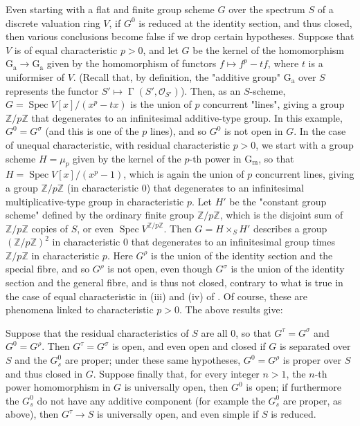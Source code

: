 \begin{remark}
    Even starting with a flat and finite group scheme $G$ over the spectrum $S$ of a discrete valuation ring $V$, if $G^0$ is reduced at the identity section, and thus closed, then various conclusions become false if we drop certain hypotheses.
    Suppose that $V$ is of equal characteristic $p>0$, and let $G$ be the kernel of the homomorphism $\operatorname{G_a}\to\operatorname{G_a}$ given by the homomorphism of functors $f\mapsto f^p-tf$, where $t$ is a uniformiser of $V$.
    (Recall that, by definition, the "additive group" $\operatorname{G_a}$ over $S$ represents the functor $S'\mapsto\operatorname{\Gamma}(S',\mathcal{O}_{S'})$).
    Then, as an $S$-scheme, $G=\operatorname{Spec} V[x]/(x^p-tx)$ is the union of $p$ concurrent "lines", giving a group $\mathbb{Z}/p\mathbb{Z}$ that degenerates to an infinitesimal additive-type group.
    In this example, $G^0=G^\sigma$ (and this is one of the $p$ lines), and so $G^0$ is not open in $G$.
    In the case of unequal characteristic, with residual characteristic $p>0$, we start with a group scheme $H=\mu_p$ given by the kernel of the $p$-th power in $\operatorname{G_m}$, so that $H=\operatorname{Spec} V[x]/(x^p-1)$, which is again the union of $p$ concurrent lines, giving a group $\mathbb{Z}/p\mathbb{Z}$ (in characteristic $0$) that degenerates to an infinitesimal multiplicative-type group in characteristic $p$.
    Let $H'$ be the "constant group scheme" defined by the ordinary finite group $\mathbb{Z}/p\mathbb{Z}$, which is the disjoint sum of $\mathbb{Z}/p\mathbb{Z}$ copies of $S$, or even $\operatorname{Spec} V^{\mathbb{Z}/p\mathbb{Z}}$.
    Then $G=H\times_S H'$ describes a group $(\mathbb{Z}/p\mathbb{Z})^2$ in characteristic $0$ that degenerates to an infinitesimal group times $\mathbb{Z}/p\mathbb{Z}$ in characteristic $p$.
    Here $G^\rho$ is the union of the identity section and the special fibre, and so $G^\rho$ is not open, even though $G^\sigma$ is the union of the identity section and the general fibre, and is thus not closed, contrary to what is true in the case of equal characteristic in (iii) and (iv) of .
    Of course, these are phenomena linked to characteristic $p>0$.
    The above results give:
\end{remark}

\begin{corollary}\label{fga3.vi-1-corollary-1.10}
    Suppose that the residual characteristics of $S$ are all $0$, so that $G^\tau=G^\sigma$ and $G^0=G^\rho$.
    Then $G^\tau=G^\sigma$ is open, and even open and closed if $G$ is separated over $S$ and the $G_s^0$ are proper;
    under these same hypotheses, $G^0=G^\rho$ is proper over $S$ and thus closed in $G$.
    Suppose finally that, for every integer $n>1$, the $n$-th power homomorphism in $G$ is universally open, then $G^0$ is open;
    if furthermore the $G_s^0$ do not have any additive component (for example the $G_s^0$ are proper, as above), then $G^\tau\to S$ is universally open, and even simple if $S$ is reduced.
\end{corollary}

